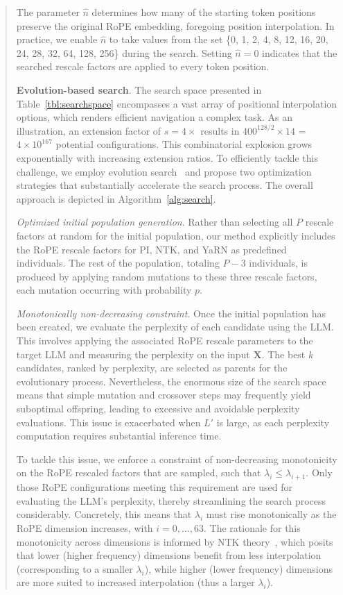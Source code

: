 \begin{abstract}
The parameter $\hat{n}$ determines how many of the starting token positions preserve the original RoPE embedding, foregoing position interpolation. In practice, we enable $\hat{n}$ to take values from the set \{0, 1, 2, 4, 8, 12, 16, 20, 24, 28, 32, 64, 128, 256\} during the search. Setting $\hat{n}=0$ indicates that the searched rescale factors are applied to every token position.

\textbf{Evolution-based search}. The search space presented in Table~\ref{tbl:searchspace} encompasses a vast array of positional interpolation options, which renders efficient navigation a complex task. As an illustration, an extension factor of $s=4\times$ results in $400^{128/2}\times14$ = $4\times10^{167}$ potential configurations. This combinatorial explosion grows exponentially with increasing extension ratios. To efficiently tackle this challenge, we employ evolution search~\cite{guo2020single} and propose two optimization strategies that substantially accelerate the search process. The overall approach is depicted in Algorithm~\ref{alg:search}.

\textit{Optimized initial population generation}. Rather than selecting all $P$ rescale factors at random for the initial population, our method explicitly includes the RoPE rescale factors for PI, NTK, and YaRN as predefined individuals. The rest of the population, totaling $P-3$ individuals, is produced by applying random mutations to these three rescale factors, each mutation occurring with probability $p$.

\textit{Monotonically non-decreasing constraint}. Once the initial population has been created, we evaluate the perplexity of each candidate using the LLM. This involves applying the associated RoPE rescale parameters to the target LLM and measuring the perplexity on the input $\mathbf{X}$. The best $k$ candidates, ranked by perplexity, are selected as parents for the evolutionary process. Nevertheless, the enormous size of the search space means that simple mutation and crossover steps may frequently yield suboptimal offspring, leading to excessive and avoidable perplexity evaluations. This issue is exacerbated when $L'$ is large, as each perplexity computation requires substantial inference time.

To tackle this issue, we enforce a constraint of non-decreasing monotonicity on the RoPE rescaled factors that are sampled, such that $\lambda_i\le \lambda_{i+1}$. Only those RoPE configurations meeting this requirement are used for evaluating the LLM's perplexity, thereby streamlining the search process considerably. Concretely, this means that $\lambda_i$ must rise monotonically as the RoPE dimension increases, with $i=0,\ldots,63$. The rationale for this monotonicity across dimensions is informed by NTK theory~\cite{jacot2018neural,tancik2020fourier,ntk}, which posits that lower (higher frequency) dimensions benefit from less interpolation (corresponding to a smaller $\lambda_i$), while higher (lower frequency) dimensions are more suited to increased interpolation (thus a larger $\lambda_i$).


\end{abstract}
